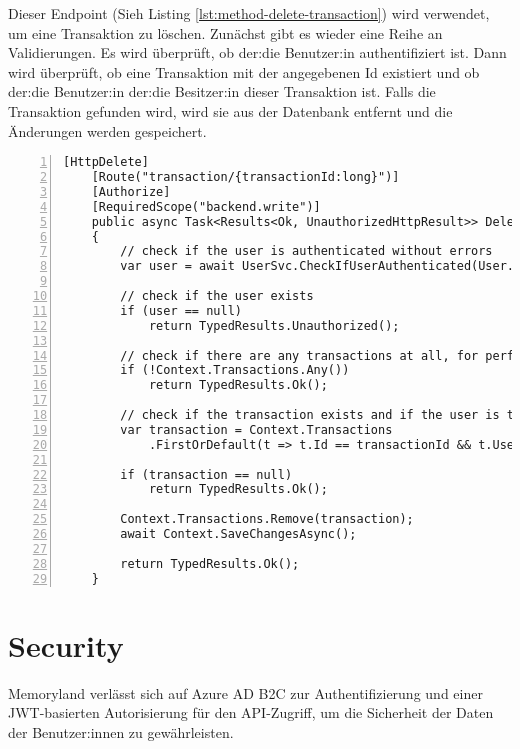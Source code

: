 Dieser Endpoint (Sieh Listing \ref{lst:method-delete-transaction}) wird verwendet, um eine Transaktion zu löschen. Zunächst gibt es wieder eine
Reihe an Validierungen. Es wird überprüft, ob der:die Benutzer:in authentifiziert ist. 
Dann wird überprüft, ob eine Transaktion mit der angegebenen Id existiert und ob der:die 
Benutzer:in der:die Besitzer:in dieser Transaktion ist. Falls die Transaktion gefunden 
wird, wird sie aus der Datenbank entfernt und die Änderungen werden gespeichert.

\begin{lstlisting}[numbers=left,caption={Methode DeleteTransactionById},label={lst:method-delete-transaction}]
    [HttpDelete]
    [Route("transaction/{transactionId:long}")]
    [Authorize]
    [RequiredScope("backend.write")]
    public async Task<Results<Ok, UnauthorizedHttpResult>> DeleteTransactionById(long transactionId)
    {
        // check if the user is authenticated without errors
        var user = await UserSvc.CheckIfUserAuthenticated(User.Claims);
        
        // check if the user exists
        if (user == null)
            return TypedResults.Unauthorized();
        
        // check if there are any transactions at all, for performance
        if (!Context.Transactions.Any()) 
            return TypedResults.Ok();
        
        // check if the transaction exists and if the user is the owner
        var transaction = Context.Transactions
            .FirstOrDefault(t => t.Id == transactionId && t.UserId == user.Id);
        
        if (transaction == null)
            return TypedResults.Ok();
        
        Context.Transactions.Remove(transaction);
        await Context.SaveChangesAsync();
            
        return TypedResults.Ok();
    }

\end{lstlisting}


\section{Security}
\label{sec:security}

Memoryland verlässt sich auf Azure AD B2C zur Authentifizierung und einer 
JWT-basierten Autorisierung für den API-Zugriff, um die Sicherheit der Daten
der Benutzer:innen zu gewährleisten.

